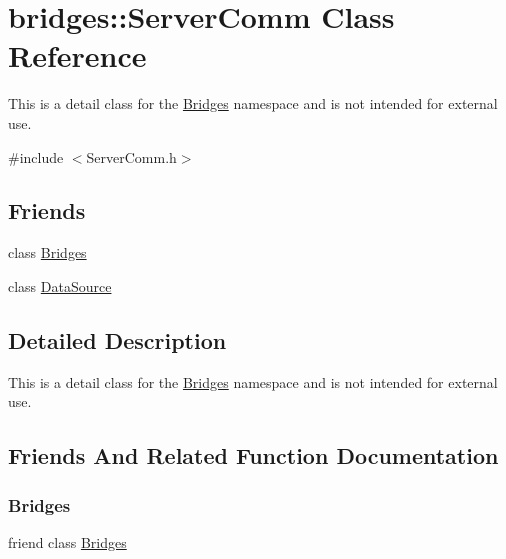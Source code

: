 \hypertarget{classbridges_1_1_server_comm}{}\section{bridges\+::Server\+Comm Class Reference}
\label{classbridges_1_1_server_comm}


This is a detail class for the \mbox{\hyperlink{classbridges_1_1_bridges}{Bridges}} namespace and is not intended for external use.  




{\ttfamily \#include $<$Server\+Comm.\+h$>$}

\subsection*{Friends}
\begin{DoxyCompactItemize}
\item 
class \mbox{\hyperlink{classbridges_1_1_server_comm_a1e7012f84e4df45aa77f36ad8d8375eb}{Bridges}}
\item 
class \mbox{\hyperlink{classbridges_1_1_server_comm_a7998ddaa8bd7c3b9a7cd2a8cbf3573c4}{Data\+Source}}
\end{DoxyCompactItemize}


\subsection{Detailed Description}
This is a detail class for the \mbox{\hyperlink{classbridges_1_1_bridges}{Bridges}} namespace and is not intended for external use. 

\subsection{Friends And Related Function Documentation}
\mbox{\label{classbridges_1_1_server_comm_a1e7012f84e4df45aa77f36ad8d8375eb}} 
\subsubsection{\texorpdfstring{Bridges}{Bridges}}
{\footnotesize\ttfamily friend class \mbox{\hyperlink{classbridges_1_1_bridges}{Bridges}}\hspace{0.3cm}{\ttfamily [friend]}}

